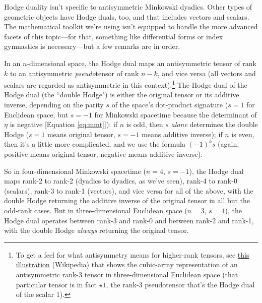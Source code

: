 \documentclass[12pt]{article}
\begin{document}
Hodge duality isn't specific to antisymmetric Minkowski dyadics. Other types of geometric objects have Hodge duals, too, and that includes vectors and scalars. The mathematical toolkit we're using isn't equipped to handle the more advanced facets of this topic---for that, something like differential forms or index gymnastics is necessary---but a few remarks are in order.

In an $n$-dimensional space, the Hodge dual maps an antisymmetric tensor of rank $k$ to an antisymmetric \emph{pseudo}tensor of rank $n - k$, and vice versa (all vectors and scalars are regarded as antisymmetric in this context).\footnote{To get a feel for what antisymmetry means for higher-rank tensors, see \href{https://en.wikipedia.org/wiki/Levi-Civita_symbol\#/media/File:Epsilontensor.svg}{this illustration} (Wikipedia) that shows the cubic-array representation of an antisymmetric rank-3 tensor in three-dimensional Euclidean space (that particular tensor is in fact $\star 1$, the rank-3 pseudotensor that's the Hodge dual of the scalar $1$).} The Hodge dual of the Hodge dual (the ``double Hodge") is either the original tensor or its additive inverse, depending on the parity $s$ of the space's dot-product signature ($s = 1$ for Euclidean space, but $s = -1$ for Minkowski spacetime because the determinant of $\eta$ is negative [Equation \ref{eq:mmt}]): if $n$ is odd, then $s$ \emph{alone} determines the double Hodge ($s = 1$ means original tensor, $s = -1$ means additive inverse); if $n$ is even, then it's a little more complicated, and we use the formula $(-1)^k s$ (again, positive means original tensor, negative means additive inverse).

So in four-dimensional Minkowski spacetime ($n = 4$, $s = -1$), the Hodge dual maps rank-2 to rank-2 (dyadics to dyadics, as we've seen), rank-4 to rank-0 (scalars), rank-3 to rank-1 (vectors), and vice versa for all of the above, with the double Hodge returning the additive inverse of the original tensor in all but the odd-rank cases. But in three-dimensional Euclidean space ($n = 3$, $s = 1$), the Hodge dual operates between rank-3 and rank-0 and between rank-2 and rank-1, with the double Hodge \emph{always} returning the original tensor.
\end{document}
